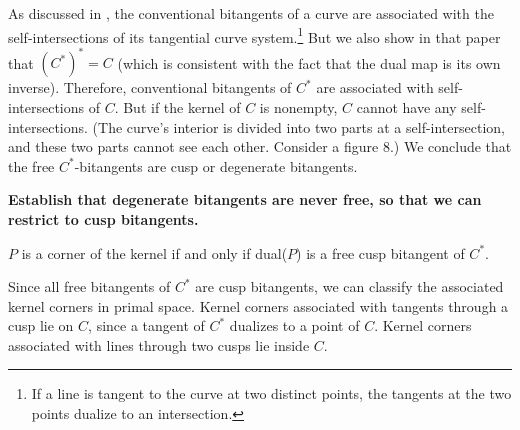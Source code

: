 \documentclass[12pt]{article}
\begin{document}


As discussed in \cite{jj02},
the conventional bitangents of a curve are associated
with the self-intersections of its tangential curve system.\footnote{If 
	a line is tangent to the curve at two distinct points,
	the tangents at the two points dualize to an intersection.}
But we also show in that paper that $(C^*)^* = C$ (which is consistent
with the fact that the dual map is its own inverse).
Therefore, conventional bitangents of $C^*$ are associated
with self-intersections of $C$.
But if the kernel of $C$ is nonempty, $C$ cannot have any self-intersections.
(The curve's interior is divided into two parts at a self-intersection,
and these two parts cannot see each other.  Consider a figure 8.)
We conclude that the free $C^*$-bitangents
are cusp or degenerate bitangents.

{\bf Establish that degenerate bitangents are never free, 
so that we can restrict to cusp bitangents.}

\begin{lemma}
$P$ is a corner of the kernel if and only if dual($P$) is a free cusp bitangent of $C^*$.
\end{lemma}

Since all free bitangents of $C^*$ are cusp bitangents,
we can classify the associated kernel corners in primal space.
Kernel corners associated with tangents through a cusp lie
on $C$, since a tangent of $C^*$ dualizes to a point of $C$.
Kernel corners associated with lines through two cusps lie
inside $C$.
\end{document}
